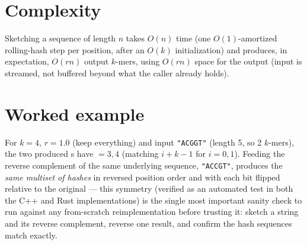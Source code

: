 \section{Complexity}

Sketching a sequence of length $n$ takes $O(n)$ time (one $O(1)$-amortized rolling-hash step per
position, after an $O(k)$ initialization) and produces, in expectation, $O(rn)$ output $k$-mers,
using $O(rn)$ space for the output (input is streamed, not buffered beyond what the caller already
holds).

\section{Worked example}

For $k=4$, $r=1.0$ (keep everything) and input \texttt{"ACGGT"} (length 5, so 2 $k$-mers), the two
produced s have  $= 3, 4$ (matching $i+k-1$ for $i=0,1$). Feeding the
reverse complement of the same underlying sequence, \texttt{"ACCGT"}, produces the \emph{same
multiset of hashes} in reversed position order and with each  bit flipped relative to
the original --- this symmetry (verified as an automated test in both the C++ and Rust
implementations) is the single most important sanity check to run against any from-scratch
reimplementation before trusting it: sketch a string and its reverse complement, reverse one
result, and confirm the hash sequences match exactly.

